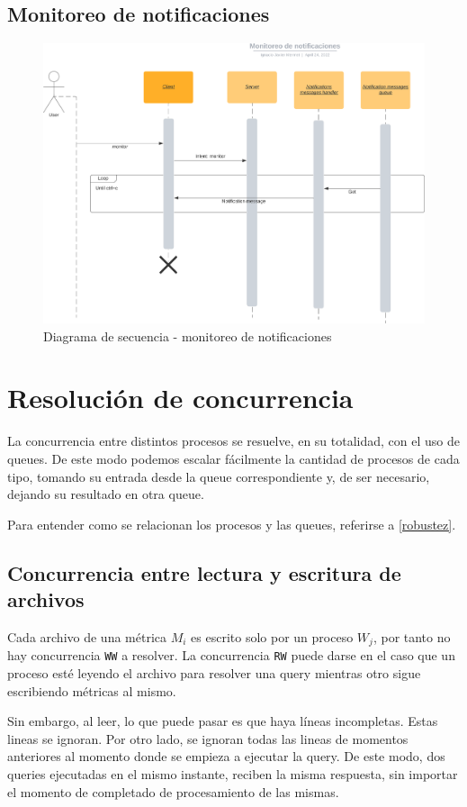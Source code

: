 \documentclass[a4paper,oneside]{article}
\begin{document}
\subsection{Monitoreo de notificaciones}
\begin{figure}[H]
\centering
\includegraphics[width=\textwidth]{images/notificaciones.png}
\caption{Diagrama de secuencia - monitoreo de notificaciones}
\end{figure}

\section{Resolución de concurrencia}
La concurrencia entre distintos procesos se resuelve, en su totalidad, con el uso de queues. De este modo podemos escalar fácilmente la cantidad de procesos de cada tipo, tomando su entrada desde la queue correspondiente y, de ser necesario, dejando su resultado en otra queue.

Para entender como se relacionan los procesos y las queues, referirse a \ref{robustez}.

\subsection{Concurrencia entre lectura y escritura de archivos}
Cada archivo de una métrica $M_i$ es escrito solo por un proceso $W_j$, por tanto no hay concurrencia \texttt{WW} a resolver. La concurrencia \texttt{RW} puede darse en el caso que un proceso esté leyendo el archivo para resolver una query mientras otro sigue escribiendo métricas al mismo.

Sin embargo, al leer, lo que puede pasar es que haya líneas incompletas. Estas lineas se ignoran. Por otro lado, se ignoran todas las lineas de momentos anteriores al momento donde se empieza a ejecutar la query. De este modo, dos queries ejecutadas en el mismo instante, reciben la misma respuesta, sin importar el momento de completado de procesamiento de las mismas.

\printbibliography
\end{document}
